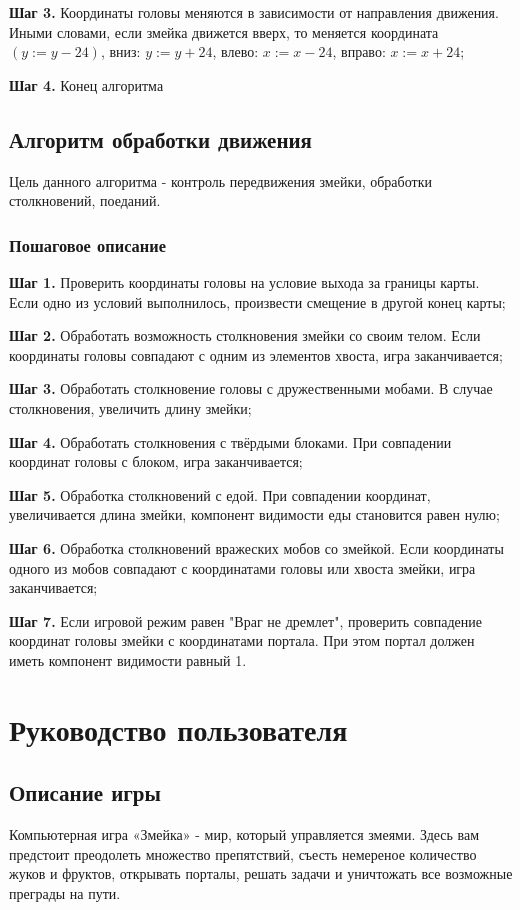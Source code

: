 \documentclass[a4paper,14pt]{extarticle}
\begin{document}
\textbf{Шаг 3.} Координаты головы меняются в зависимости от направления движения. Иными словами, если змейка движется вверх, то меняется координата $(y:= y - 24)$, вниз: $y:= y + 24$, влево: $x:= x - 24$, вправо: $x:= x + 24$;

\textbf{Шаг 4.} Конец алгоритма
 
\subsection{Алгоритм обработки движения}
Цель данного алгоритма - контроль передвижения змейки, обработки столкновений, поеданий.
\subsubsection{Пошаговое описание}
\textbf{Шаг 1.} Проверить координаты головы на условие выхода за границы карты. Если одно из условий выполнилось, произвести смещение в другой конец карты;

\textbf{Шаг 2.} Обработать возможность столкновения змейки со своим телом. Если координаты головы совпадают с одним из элементов хвоста, игра заканчивается;

\textbf{Шаг 3.} Обработать столкновение головы с дружественными мобами. В случае столкновения, увеличить длину змейки;

\textbf{Шаг 4.} Обработать столкновения с твёрдыми блоками. При совпадении координат головы с блоком, игра заканчивается;

\textbf{Шаг 5.} Обработка столкновений с едой. При совпадении координат, увеличивается длина змейки, компонент видимости еды становится равен нулю;

\textbf{Шаг 6.} Обработка столкновений вражеских мобов со змейкой. Если координаты одного из мобов совпадают с координатами головы или хвоста змейки, игра заканчивается;

\textbf{Шаг 7.} Если игровой режим равен "Враг не дремлет", проверить совпадение координат головы змейки с координатами портала. При этом портал должен иметь компонент видимости равный 1.

\section{Руководство пользователя}
\subsection{Описание игры}
Компьютерная игра «Змейка» - мир, который управляется змеями. Здесь вам предстоит преодолеть множество препятствий, съесть немереное количество жуков и фруктов, открывать порталы, решать задачи и уничтожать все возможные преграды на пути.
\end{document}
